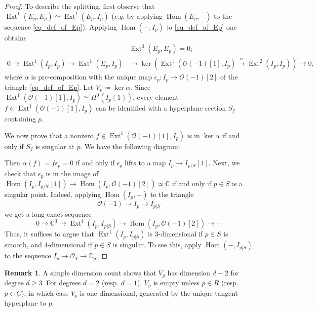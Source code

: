 \documentclass[11pt]{amsart}
\theoremstyle{definition}
\newtheorem{remark}[thm]{Remark}
\newcommand{\C}{\mathbb{C}}
\DeclareMathOperator{\Hom}{Hom}
\DeclareMathOperator{\Ext}{Ext}
\newcommand{\sO}{\mathcal{O}}
\begin{document}
\begin{proof}
To describe the splitting, first observe that $\Ext^1(E_p,E_p)\simeq \Ext^1(E_p,I_p)$ (\textit{e.g.} by applying $\Hom(E_p,-)$ to the sequence \eqref{eq_def_of_Ep}). Applying $\Hom(-,I_p)$ to \eqref{eq_def_of_Ep} one obtains
\begin{equation*}
\begin{split}
    &\Ext^3(E_p,E_p)=0; \\
     0\to \Ext^1(I_p,I_p) \to   \Ext^1(E_p,I_p) & \to \ker\left(\Ext^1(\sO(-1)[1],I_p)\xrightarrow{\alpha} \Ext^2(I_p,I_p)\right) \to 0,
\end{split}
\end{equation*}
where $\alpha$ is pre-composition with the unique map $\epsilon_p :I_p\to \sO(-1)[2]$ of the triangle \eqref{eq_def_of_Ep}. Let $V_p\coloneqq \ker\alpha$. Since $\Ext^1(\sO(-1)[1],I_p)\simeq H^0(I_p(1))$, every element $f\in \Ext^1(\sO(-1)[1],I_p)$ can be identified with a hyperplane section $S_f$ containing $p$.

We now prove that a nonzero $f\in \Ext^1(\sO(-1)[1],I_p)$ is in $\ker \alpha$ if and only if $S_f$ is singular at $p$. We have the following diagram:
\begin{center}
\end{center}
Then $\alpha(f)=f\epsilon_p=0$ if and only if $\epsilon_p$ lifts to a map $I_p\rightarrow I_{p/S}[1]$. Next, we check that $\epsilon_p$ is in the image of $\Hom(I_p,I_{p/S}[1])\rightarrow \Hom(I_p,\sO(-1)[2])\simeq \C$ if and only if $p\in S$ is a singular point. Indeed, applying $\Hom(I_p,-)$ to the triangle $$\sO(-1)\to I_p\to I_{p|S}$$ we get a long exact sequence
$$0\to \C^3\to \Ext^1(I_p,I_{p|S})\to \Hom(I_p,\sO(-1)[2]) \to \cdots$$
Thus, it suffices to argue that $\Ext^1(I_p,I_{p|S})$ is $3$-dimensional if $p\in S$ is smooth, and $4$-dimensional if $p\in S$ is singular. To see this, apply $\Hom(-,I_{p|S})$ to the sequence $I_p\to \sO_Y\to \C_p$.
\end{proof}

\begin{remark}\label{rmk_DimOfVp}
A simple dimension count shows that $V_p$ has dimension $d-2$ for degree $d\geq 3$. For degrees $d=2$ (resp. $d=1$), $V_p$ is empty unless $p\in R$ (resp. $p\in C$), in which case $V_p$ is one-dimensional, generated by the unique tangent hyperplane to $p$. 
\end{remark}
\end{document}
